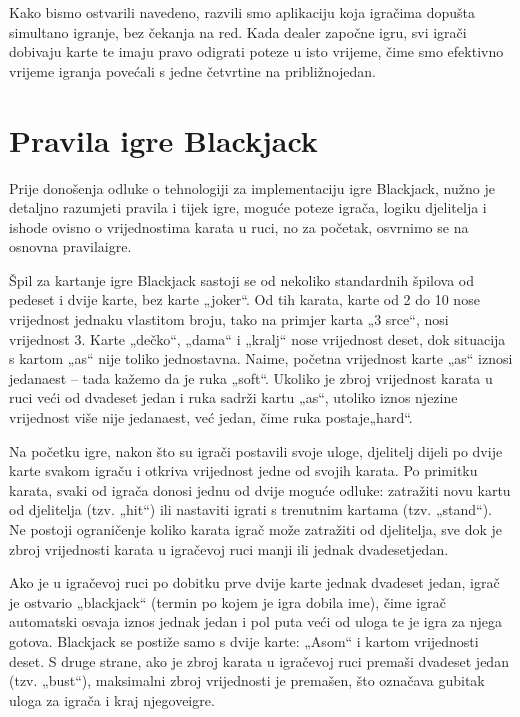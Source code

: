 \documentclass{IEEEcsmag}
\begin{document}
Kako bismo ostvarili navedeno, razvili smo aplikaciju koja igračima dopušta simultano igranje, bez čekanja na red. Kada dealer započne igru, svi igrači dobivaju karte te imaju pravo odigrati poteze u isto vrijeme, čime smo efektivno vrijeme igranja povećali s jedne četvrtine na približno\break jedan.

\newpage

\section{Pravila igre Blackjack}
\vspace{5mm}
Prije donošenja odluke o tehnologiji za implementaciju igre Blackjack, nužno je detaljno razumjeti pravila i tijek igre, moguće poteze igrača, logiku djelitelja i ishode ovisno o vrijednostima karata u ruci, no za početak, osvrnimo se na osnovna pravila\break igre.

Špil za kartanje igre Blackjack sastoji se od nekoliko standardnih špilova od pedeset i dvije karte, bez karte „joker“. Od tih karata, karte od 2 do 10 nose vrijednost jednaku vlastitom broju, tako na primjer karta „3 srce“, nosi vrijednost 3. Karte „dečko“, „dama“ i „kralj“ nose vrijednost deset, dok situacija s kartom „as“ nije toliko jednostavna. Naime, početna vrijednost karte „as“ iznosi jedanaest – tada kažemo da je ruka „soft“. Ukoliko je zbroj vrijednost karata u ruci veći od dvadeset jedan i ruka sadrži kartu „as“, utoliko iznos njezine vrijednost više nije jedanaest, već jedan, čime ruka postaje\break „hard“.

Na početku igre, nakon što su igrači postavili svoje uloge, djelitelj dijeli po dvije karte svakom igraču i otkriva vrijednost jedne od svojih karata. Po primitku karata, svaki od igrača donosi jednu od dvije moguće odluke: zatražiti novu kartu od djelitelja (tzv. „hit“) ili nastaviti igrati s trenutnim kartama (tzv. „stand“). Ne postoji ograničenje koliko karata igrač može zatražiti od djelitelja, sve dok je zbroj vrijednosti karata u igračevoj ruci manji ili jednak dvadeset\break jedan. 

Ako je u igračevoj ruci po dobitku prve dvije karte jednak dvadeset jedan, igrač je ostvario „blackjack“ (termin po kojem je igra dobila ime), čime igrač automatski osvaja iznos jednak jedan i pol puta veći od uloga te je igra za njega gotova. Blackjack se postiže samo s dvije karte: „Asom“ i kartom vrijednosti deset. S druge strane, ako je zbroj karata u igračevoj ruci premaši  dvadeset jedan (tzv. „bust“), maksimalni zbroj vrijednosti je premašen, što označava gubitak uloga za igrača i kraj njegove\break igre. 
\end{document}
